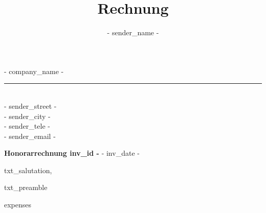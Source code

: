 \documentclass{invoice-de}
\title{Rechnung}
\author{ {{- sender_name -}} }
\newlength{\rt}\setlength{\rt}{0.4pt}
\begin{document}

{\flushright
{\large{ {{- company_name -}} }}\\
    \vspace{-0.7em}
    \rule{160mm}{\rt}\\
    \vspace{0.5em}
    {{- sender_street -}}\\
{{- sender_city -}}\\
{{- sender_tele -}}\\
{{- sender_email -}}\\
}

{
}


    \vspace{2em}
    \textbf{Honorarrechnung {{ inv_id -}} } \hfill{ {{- inv_date -}} }\\

    \RaggedRight

    {{txt_salutation}},

    \vspace{1em}

    {{txt_preamble}}


    \begin{invoiceTable}
    {{ expenses }}
        \subtotal



    \end{invoiceTable}

\end{document}
